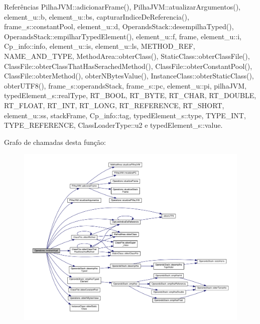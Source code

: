 Referências Pilha\+J\+V\+M\+::adicionar\+Frame(), Pilha\+J\+V\+M\+::atualizar\+Argumentos(), element\+\_\+u\+::b, element\+\_\+u\+::bs, capturar\+Indice\+De\+Referencia(), frame\+\_\+s\+::constant\+Pool, element\+\_\+u\+::d, Operands\+Stack\+::desempilha\+Typed(), Operands\+Stack\+::empilhar\+Typed\+Element(), element\+\_\+u\+::f, frame, element\+\_\+u\+::i, Cp\+\_\+info\+::info, element\+\_\+u\+::is, element\+\_\+u\+::ls, M\+E\+T\+H\+O\+D\+\_\+\+R\+EF, N\+A\+M\+E\+\_\+\+A\+N\+D\+\_\+\+T\+Y\+PE, Method\+Area\+::obter\+Class(), Static\+Class\+::obter\+Class\+File(), Class\+File\+::obter\+Class\+That\+Has\+Serached\+Method(), Class\+File\+::obter\+Constant\+Pool(), Class\+File\+::obter\+Method(), obter\+N\+Bytes\+Value(), Instance\+Class\+::obter\+Static\+Class(), obter\+U\+T\+F8(), frame\+\_\+s\+::operands\+Stack, frame\+\_\+s\+::pc, element\+\_\+u\+::pi, pilha\+J\+VM, typed\+Element\+\_\+s\+::real\+Type, R\+T\+\_\+\+B\+O\+OL, R\+T\+\_\+\+B\+Y\+TE, R\+T\+\_\+\+C\+H\+AR, R\+T\+\_\+\+D\+O\+U\+B\+LE, R\+T\+\_\+\+F\+L\+O\+AT, R\+T\+\_\+\+I\+NT, R\+T\+\_\+\+L\+O\+NG, R\+T\+\_\+\+R\+E\+F\+E\+R\+E\+N\+CE, R\+T\+\_\+\+S\+H\+O\+RT, element\+\_\+u\+::ss, stack\+Frame, Cp\+\_\+info\+::tag, typed\+Element\+\_\+s\+::type, T\+Y\+P\+E\+\_\+\+I\+NT, T\+Y\+P\+E\+\_\+\+R\+E\+F\+E\+R\+E\+N\+CE, Class\+Loader\+Type\+::u2 e typed\+Element\+\_\+s\+::value.

Grafo de chamadas desta função\+:\nopagebreak
\begin{figure}[H]
\begin{center}
\leavevmode
\includegraphics[width=350pt]{classOperations_acf53d7e184b8828702b4d5036ef0a7a9_cgraph}
\end{center}
\end{figure}
\mbox{\label{classOperations_aaa890c310bc7a93e97b2c5004df94e70}} 
